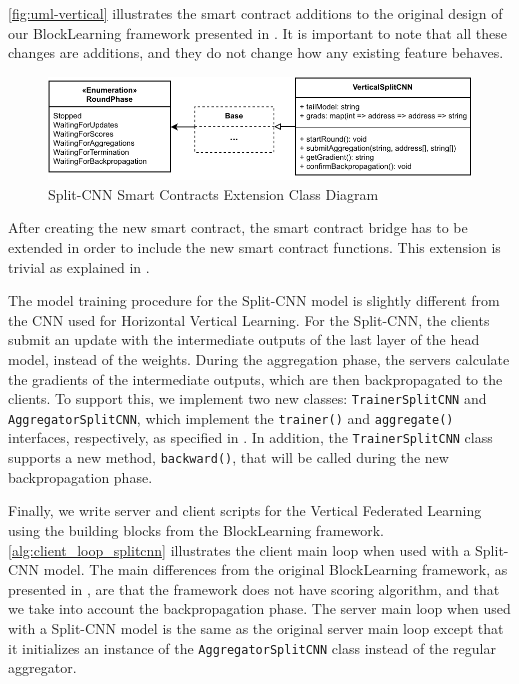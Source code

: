 \autoref{fig:uml-vertical} illustrates the smart contract additions to the original design of our BlockLearning framework presented in . It is important to note that all these changes are additions, and they do not change how any existing feature behaves.

\begin{figure}[!ht]
    \centering
    \centering
    \includegraphics[width=1\textwidth]{graphics/smart-contract-uml-vertical.pdf}
    \caption{Split-CNN Smart Contracts Extension Class Diagram}
    \label{fig:uml-vertical}
\end{figure}

After creating the new smart contract, the smart contract bridge has to be extended in order to include the new smart contract functions. This extension is trivial as explained in .

The model training procedure for the Split-CNN model is slightly different from the CNN used for Horizontal Vertical Learning. For the Split-CNN, the clients submit an update with the intermediate outputs of the last layer of the head model, instead of the weights. During the aggregation phase, the servers calculate the gradients of the intermediate outputs, which are then backpropagated to the clients. To support this, we implement two new classes: \texttt{TrainerSplitCNN} and \texttt{AggregatorSplitCNN}, which implement the \texttt{trainer()} and \texttt{aggregate()} interfaces, respectively, as specified in . In addition, the \texttt{TrainerSplitCNN} class supports a new method, \texttt{backward()}, that will be called during the new backpropagation phase.

Finally, we write server and client scripts for the Vertical Federated Learning using the building blocks from the BlockLearning framework. \autoref{alg:client_loop_splitcnn} illustrates the client main loop when used with a Split-CNN model. The main differences from the original BlockLearning framework, as presented in , are that the framework does not have scoring algorithm, and that we take into account the backpropagation phase. The server main loop when used with a Split-CNN model is the same as the original server main loop except that it initializes an instance of the \texttt{AggregatorSplitCNN} class instead of the regular aggregator.

